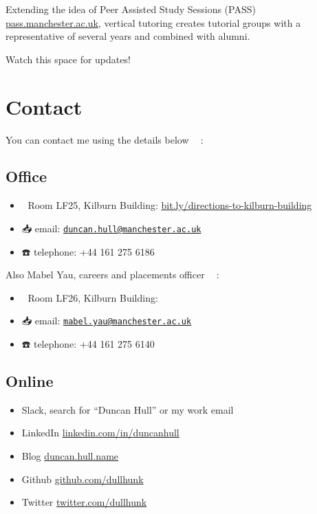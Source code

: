 \documentclass[12pt,]{book}
\providecommand{\tightlist}{%
  \setlength{\itemsep}{0pt}\setlength{\parskip}{0pt}}
\begin{document}
Extending the idea of Peer Assisted Study Sessions (PASS) \href{http://www.pass.manchester.ac.uk}{pass.manchester.ac.uk}, vertical tutoring creates tutorial groups with a representative of several years and combined with alumni.

Watch this space for updates!

\hypertarget{contact}{%
\chapter{Contact}\label{contact}}

You can contact me using the details below 👨‍💻 :

\hypertarget{office}{%
\section{Office}\label{office}}

\begin{itemize}
\tightlist
\item
  🏢 Room LF25, Kilburn Building: \href{http://bit.ly/directions-to-kilburn-building}{bit.ly/directions-to-kilburn-building}
\item
  📥 email: \href{mailto:duncan.hull@manchester.ac.uk}{\nolinkurl{duncan.hull@manchester.ac.uk}}
\item
  ☎️ telephone: +44 161 275 6186
\end{itemize}

Also Mabel Yau, careers and placements officer 👩‍💻 :

\begin{itemize}
\tightlist
\item
  🏢 Room LF26, Kilburn Building:
\item
  📥 email: \href{mailto:mabel.yau@manchester.ac.uk}{\nolinkurl{mabel.yau@manchester.ac.uk}}
\item
  ☎️ telephone: +44 161 275 6140
\end{itemize}

\hypertarget{online}{%
\section{Online}\label{online}}

\begin{itemize}
\tightlist
\item
  Slack, search for ``Duncan Hull'' or my work email
\item
  LinkedIn \href{https://uk.linkedin.com/in/duncanhull}{linkedin.com/in/duncanhull}
\item
  Blog \href{https://duncan.hull.name}{duncan.hull.name}
\item
  Github \href{https://github.com/dullhunk}{github.com/dullhunk}
\item
  Twitter \href{https://twitter.com/dullhunk}{twitter.com/dullhunk}
\end{itemize}
\end{document}
